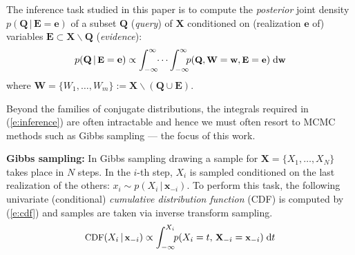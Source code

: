 \documentclass{article} %
\renewcommand{\vec}[1]{\mathbf{#1}}
\newcommand{\bvec}[1]{\textbf{#1}}
\newcommand{\pr}{p}
\newcommand{\dd}{\;\mathrm{d}} %
\begin{document}
The inference task studied in this paper is to compute the \emph{posterior} joint density 
$\pr(\bvec{Q} \,|\, \bvec{E}=\bvec{e})$
of 
a subset $\bvec{Q}$ (\emph{query}) of $\bvec{X}$ 
conditioned on (realization $\bvec{e}$ of) 
variables  
$\bvec{E} \subset\bvec{X} \backslash \bvec{Q}$ (\emph{evidence}):
\begin{equation}\vspace{-0.5mm}\footnotesize
\label{e:inference}
\pr(\vec{Q} \,|\, \bvec{E} =\vec{e}) \propto 
\int_{-\infty}^{\infty} \!\! \cdots \int_{-\infty}^{\infty}
\!\!\! \pr(\bvec{Q}, \bvec{W} = \bvec{w}, \bvec{E}=\bvec{e} )
 \dd \bvec{w}
\end{equation}
where $\bvec{W} = \{W_1, \ldots, W_m\} := \vec{X} \backslash (\vec{Q} \cup \vec{E})$. %

Beyond the families of conjugate distributions, the integrals required in 
(\ref{e:inference}) 
are often intractable and hence we must often resort to MCMC methods
such as Gibbs sampling --- the focus of this work.

{\bf Gibbs sampling:}
 In Gibbs  sampling \cite{geman1984stochastic} drawing a sample for $\bvec{X} = \{X_1, \ldots, X_N\}$ takes place in $N$ steps.
In the $i$-th step, $X_i$ is sampled conditioned on the last realization of the others:
$x_i \sim \pr(X_i \,|\, \bvec{x}_{-i})$. 
To perform this task, the following univariate (conditional) \emph{cumulative distribution function} (CDF)
is computed by (\ref{e:cdf}) and samples are taken via inverse transform sampling. 
\begin{equation} \footnotesize
\label{e:cdf}
\text{CDF}(X_i  \,|\, \bvec{x}_{-i}) 
\propto
\int_{-\infty}^{X_i} \!\! \pr(X_i = t, \,\bvec{X}_{-i} = \bvec{x}_{-i})  \dd  t
\end{equation} 
\end{document}

